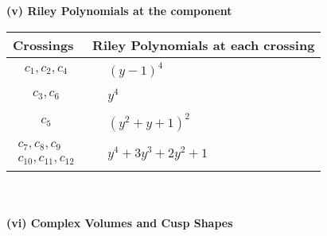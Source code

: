 \documentclass[1p]{elsarticle_modified}
\theoremstyle{definition}
\begin{document}
\newpage\renewcommand{\arraystretch}{1}
\flushleft \textbf{(v) Riley Polynomials at the component}\newline \\
\begin{tabular}{m{50pt}|m{274pt}}
Crossings & \hspace{64pt}Riley Polynomials at each crossing \\
\hline $$\begin{aligned}c_{1},c_{2},c_{4}\end{aligned}$$&$\begin{aligned}
&(y-1)^4
\end{aligned}$\\
\hline $$\begin{aligned}c_{3},c_{6}\end{aligned}$$&$\begin{aligned}
&y^4
\end{aligned}$\\
\hline $$\begin{aligned}c_{5}\end{aligned}$$&$\begin{aligned}
&(y^2+y+1)^2
\end{aligned}$\\
\hline $$\begin{aligned}c_{7},c_{8},c_{9}\\c_{10},c_{11},c_{12}\end{aligned}$$&$\begin{aligned}
&y^4+3 y^3+2 y^2+1
\end{aligned}$\\
\hline
\end{tabular}\\~\\
\newpage\flushleft \textbf{(vi) Complex Volumes and Cusp Shapes}
\end{document}
